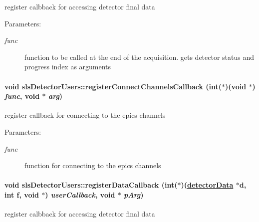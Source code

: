 register calbback for accessing detector final data 

\begin{Desc}
\item[Parameters:]
\begin{description}
\item[{\em func}]function to be called at the end of the acquisition. gets detector status and progress index as arguments \end{description}
\end{Desc}
\hypertarget{classslsDetectorUsers_d1ab73675435879c2c5cef7adab02c32}{
\paragraph[registerConnectChannelsCallback]{\setlength{\rightskip}{0pt plus 5cm}void sls\-Detector\-Users::register\-Connect\-Channels\-Callback (int($\ast$)(void $\ast$) {\em func}, void $\ast$ {\em arg})}\hfill}
\label{classslsDetectorUsers_d1ab73675435879c2c5cef7adab02c32}


register callback for connecting to the epics channels 

\begin{Desc}
\item[Parameters:]
\begin{description}
\item[{\em func}]function for connecting to the epics channels \end{description}
\end{Desc}
\hypertarget{classslsDetectorUsers_4a1db91fc49fc1710f98ce98e33bc16b}{
\paragraph[registerDataCallback]{\setlength{\rightskip}{0pt plus 5cm}void sls\-Detector\-Users::register\-Data\-Callback (int($\ast$)(\hyperlink{classdetectorData}{detector\-Data} $\ast$d, int f, void $\ast$) {\em user\-Callback}, void $\ast$ {\em p\-Arg})}\hfill}
\label{classslsDetectorUsers_4a1db91fc49fc1710f98ce98e33bc16b}


register calbback for accessing detector final data 

